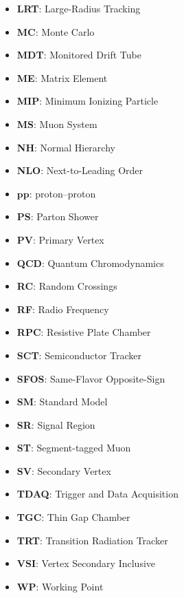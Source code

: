 \begin{itemize}
    \item \textbf{LRT}: Large-Radius Tracking
    \item \textbf{MC}: Monte Carlo
    \item \textbf{MDT}: Monitored Drift Tube
    \item \textbf{ME}: Matrix Element
    \item \textbf{MIP}: Minimum Ionizing Particle
    \item \textbf{MS}: Muon System
    \item \textbf{NH}: Normal Hierarchy
    \item \textbf{NLO}: Next-to-Leading Order
    \item $\mathbf{pp}$: proton--proton
    \item \textbf{PS}: Parton Shower
    \item \textbf{PV}: Primary Vertex
    \item \textbf{QCD}: Quantum Chromodynamics
    \item \textbf{RC}: Random Crossings
    \item \textbf{RF}: Radio Frequency
    \item \textbf{RPC}: Resistive Plate Chamber
    \item \textbf{SCT}: Semiconductor Tracker
    \item \textbf{SFOS}: Same-Flavor Opposite-Sign
    \item \textbf{SM}: Standard Model
    \item \textbf{SR}: Signal Region
    \item \textbf{ST}: Segment-tagged Muon
    \item \textbf{SV}: Secondary Vertex
    \item \textbf{TDAQ}: Trigger and Data Acquisition 
    \item \textbf{TGC}: Thin Gap Chamber
    \item \textbf{TRT}: Transition Radiation Tracker
    \item \textbf{VSI}: Vertex Secondary Inclusive
    \item \textbf{WP}: Working Point
\end{itemize}

